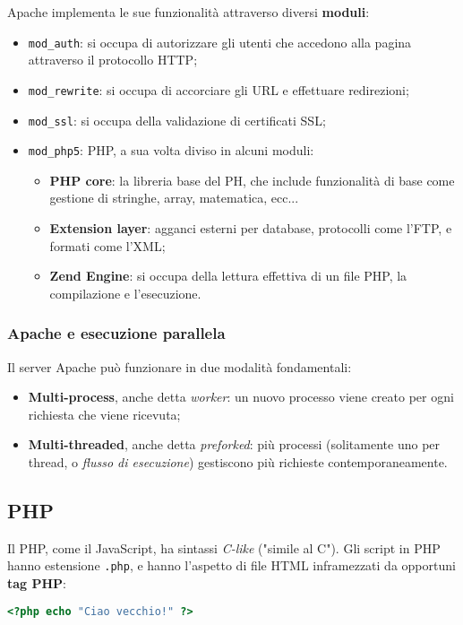 \documentclass[a4paper,11pt]{article}
\begin{document}
Apache implementa le sue funzionalità attraverso diversi \textbf{moduli}:
\begin{itemize}
	\item \lstinline|mod_auth|: si occupa di autorizzare gli utenti che accedono alla pagina attraverso il protocollo HTTP;
	\item \lstinline|mod_rewrite|: si occupa di accorciare gli URL e effettuare redirezioni;
	\item \lstinline|mod_ssl|: si occupa della validazione di certificati SSL;
	\item \lstinline|mod_php5|: PHP, a sua volta diviso in alcuni moduli:
		\begin{itemize}
			\item \textbf{PHP core}: la libreria base del PH, che include funzionalità di base come gestione di stringhe, array, matematica, ecc...
			\item \textbf{Extension layer}: agganci esterni per database, protocolli come l'FTP, e formati come l'XML;
			\item \textbf{Zend Engine}: si occupa della lettura effettiva di un file PHP, la compilazione e l'esecuzione. 
		\end{itemize}
\end{itemize}

\subsubsection{Apache e esecuzione parallela}
Il server Apache può funzionare in due modalità fondamentali:
\begin{itemize}
	\item \textbf{Multi-process}, anche detta \textit{worker}: un nuovo processo viene creato per ogni richiesta che viene ricevuta;
	\item \textbf{Multi-threaded}, anche detta \textit{preforked}: più processi (solitamente uno per thread, o \textit{flusso di esecuzione}) gestiscono più richieste contemporaneamente.  
\end{itemize}

\subsection{PHP}
Il PHP, come il JavaScript, ha sintassi \textit{C-like} ("simile al C").
Gli script in PHP hanno estensione \lstinline|.php|, e hanno l'aspetto di file HTML inframezzati da opportuni \textbf{tag PHP}:
\begin{lstlisting}[language=php, style=codestyle]	
<?php echo "Ciao vecchio!" ?>
\end{lstlisting}
\end{document}
